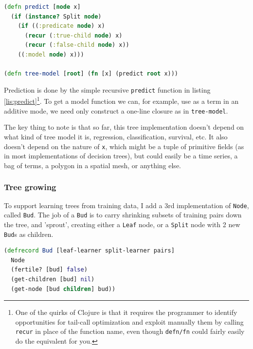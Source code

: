 \documentclass[11pt,openany,american,usenames,dvipsnames,svgnames,x11names,table,isodate]{article}
\numberwithin{equation}{section}
\numberwithin{figure}{section}
\begin{document}
\begin{minipage}[t]{1\columnwidth}%
\begin{lstlisting}[caption={Generic prediction},label={lis:predict},language=clojure,tabsize=2]
(defn predict [node x]
  (if (instance? Split node)
    (if ((:predicate node) x)
      (recur (:true-child node) x)
      (recur (:false-child node) x))
	((:model node) x)))

(defn tree-model [root] (fn [x] (predict root x))) 
\end{lstlisting}
%
\end{minipage}

Prediction is done by the simple recursive \texttt{predict} function
in listing \ref{lis:predict}\footnote{One of the quirks of Clojure is that it requires the programmer to
identify opportunities for tail-call optimization and exploit manually
them by calling \texttt{recur} in place of the function name, even
though \texttt{defn/fn} could fairly easily do the equivalent for
you.}. To get a model function we can, for example, use as a term in an
additive mode, we need only construct a one-line closure as in \texttt{tree-model}.

The key thing to note is that so far, this tree implementation doesn't
depend on what kind of tree model it is, regression, classification,
survival, etc. It also doesn't depend on the nature of \texttt{x},
which might be a tuple of primitive fields (as in most implementations
of decision trees), but could easily be a time series, a bag of terms,
a polygon in a spatial mesh, or anything else.

\subsubsection{Tree growing}

To support learning trees from training data, I add a 3rd implementation
of \texttt{Node}, called \texttt{Bud}. The job of a \texttt{Bud} is
to carry shrinking subsets of training pairs down the tree, and 'sprout',
creating either a \texttt{Leaf} node, or a \texttt{Split} node with
2 new \texttt{Bud}s as children. 

\begin{minipage}[t]{1\columnwidth}%
\begin{lstlisting}[caption={Buds},label={lis:bud-defrecord},language=clojure,tabsize=2]
(defrecord Bud [leaf-learner split-learner pairs]
  Node
  (fertile? [bud] false)
  (get-children [bud] nil)
  (get-node [bud children] bud)) 
\end{lstlisting}
%
\end{minipage}
\end{document}
